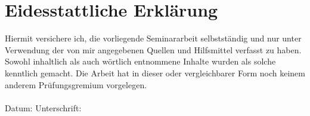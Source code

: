 \chapter*{Eidesstattliche Erklärung}
\label{erklaerung}
Hiermit versichere ich, die vorliegende Seminararbeit selbstständig und nur unter Verwendung der von mir angegebenen Quellen und Hilfsmittel verfasst zu haben. Sowohl inhaltlich als auch wörtlich entnommene Inhalte wurden als solche kenntlich gemacht. Die Arbeit hat in dieser oder vergleichbarer Form noch keinem anderem Prüfungsgremium vorgelegen. \\
\\[1.5cm]
Datum:	\hrulefill\enspace Unterschrift: \hrulefill
\\[3.5cm]
